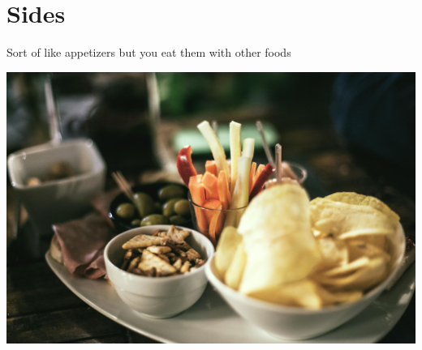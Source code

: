 \pagebreak
\chapter{Sides}

Sort of like appetizers but you eat them with other foods

\centering
\includegraphics[scale=0.08]{images/food-vegetables-italian-restaurant.jpg}
